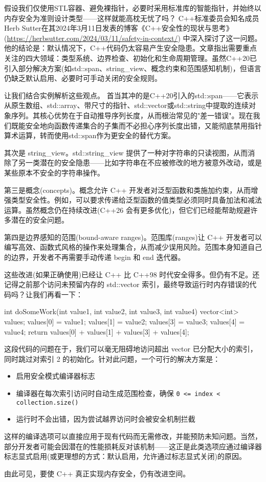 
假设我们仅使用STL容器、避免裸指针，必要时采用标准库的智能指针，并始终以内存安全为准则设计类型——这样就能高枕无忧了吗？
C++标准委员会知名成员Herb Sutter在其2024年3月11日发表的博客《C++安全性的现状与思考》(\url{https://herbsutter.com/2024/03/11/safety-in-context/}) 中深入探讨了这一问题。他的结论是：默认情况下，C++代码仍太容易产生安全隐患。文章指出需要重点关注的四大领域：类型系统、边界检查、初始化和生命周期管理。虽然C++20已引入部分解决方案(如std::span、string\_view、概念约束和范围感知机制)，但语言仍缺乏默认启用、必要时可手动关闭的安全规则。

让我们结合实例解析这些观点。
首当其冲的是C++20引入的std::span——它表示从原生数组、std::array、带尺寸的指针、std::vector或std::string中提取的连续对象序列。其核心优势在于自动推导序列长度，从而根治常见的"差一错误"。现在我们既能安全地向函数传递集合的子集而不必担心序列长度出错，又能彻底禁用指针算术运算，转而使用std::span作为更安全的替代方案。

其次是 string\_view。std::string\_view 提供了一种对字符串的只读视图，从而消除了另一类潜在的安全隐患——比如字符串在不应被修改的地方被意外改动，或是某些原本不安全的字符串操作。

第三是概念(concepts)。概念允许 C++ 开发者对泛型函数和类施加约束，从而增强类型安全性。例如，可以要求传递给泛型函数的值类型必须同时具备加法和减法运算。虽然概念仍在持续改进(C++26 会有更多优化)，但它们已经能帮助规避许多潜在的安全问题。

第四是边界感知的范围(bound-aware ranges)。范围库(ranges)让 C++ 开发者可以编写高效、函数式风格的操作来处理集合，从而减少误用风险。范围本身知道自己的边界，开发者不再需要手动传递 begin 和 end 迭代器。

这些改进(如果正确使用)已经让 C++ 比 C++98 时代安全得多。但仍有不足。还记得之前那个访问未预留内存的 std::vector 索引，最终导致运行时内存错误的代码吗？让我们再看一下：

\begin{cpp}
int doSomeWork(int value1, int value2, int value3, int value4) {
  vector<int> values;
  values[0] = value1;
  values[1] = value2;
  values[3] = value3;
  values[4] = value4;
  return values[0] + values[1] + values[3] + values[4];
}
\end{cpp}

这段代码的问题在于，我们可以毫无阻碍地访问超出 vector 已分配大小的索引，同时跳过对索引 2 的初始化。针对此问题，一个可行的解决方案是：

\begin{itemize}
\item 
启用安全模式编译器标志

\item 
编译器在每次索引访问时自动生成范围检查，确保 \verb|0 <= index < collection.size()|

\item 
运行时不会出错，因为尝试越界访问时会被安全机制拦截
\end{itemize}

这样的编译选项可以直接应用于现有代码而无需修改，并能预防未知问题。当然，部分开发者可能会因潜在的性能损耗反对该机制——这正是此类选项应通过编译器标志显式启用(或更理想的方式：默认启用，允许通过标志显式关闭)的原因。

由此可见，要使 C++ 真正实现内存安全，仍有改进空间。